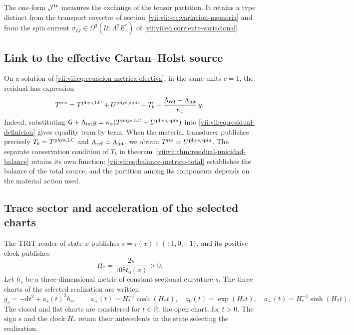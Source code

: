 The one-form \(\mathcal J^{\rm tr}\) measures the exchange of the tensor
partition. It retains a type distinct from the transport covector of
section~\ref{vii:vii:sec:variacion-memoria} and from the spin current
\(\sigma_{IJ}\in\Omega^3(\mathcal U;\Lambda^2E^*)\) of
\eqref{vii:vii:eq:corriente-variacional}.

\subsection{Link to the effective Cartan--Holst source}
\label{vii:vii:subsec:residual-fuente-cartan}

On a solution of \eqref{vii:vii:eq:ecuacion-metrica-efectiva}, in the
same units \(c=1\), the residual has expression
\begin{equation}
 T^{\rm res}
 =T^{\rm phys,LC}+U^{\rm phys,spin}-T_b
   +\frac{\Lambda_{\rm ref}-\Lambda_{\rm int}}{\kappa_x}\,g.
 \label{vii:vii:eq:residual-composicion-cartan}
\end{equation}
Indeed, substituting
\(\mathsf G+\Lambda_{\rm int}g
  =\kappa_x(T^{\rm phys,LC}+U^{\rm phys,spin})\)
into \eqref{vii:vii:eq:residual-definicion} gives equality term by term.
When the material transducer publishes precisely
\(T_b=T^{\rm phys,LC}\) and \(\Lambda_{\rm ref}=\Lambda_{\rm int}\),
we obtain \(T^{\rm res}=U^{\rm phys,spin}\).
The separate conservation condition of \(T_b\) in
theorem~\ref{vii:vii:thm:residual-unicidad-balance} retains its own
function: \eqref{vii:vii:eq:balance-metrico-total} establishes the balance of the
total source, and the partition among its components depends on the material
action used.

\subsection{Trace sector and acceleration of the selected charts}
\label{vii:vii:subsec:residual-aceleracion-ds}

The TRIT reader of state \(x\) publishes \(s=\tau(x)\in\{+1,0,-1\}\),
and its positive clock publishes
\begin{equation}
 H_*=\frac{2\pi}{108t_0(x)}>0.
 \label{vii:vii:eq:reloj-carta-ds}
\end{equation}
Let \(h_s\) be a three-dimensional metric of constant sectional curvature
\(s\). The three charts of the selected realization are written
\begin{equation}
 g_s=-\mathrm dt^2+a_s(t)^2h_s,\qquad
 a_+(t)=H_*^{-1}\cosh(H_*t),\quad
 a_0(t)=\exp(H_*t),\quad
 a_-(t)=H_*^{-1}\sinh(H_*t).
 \label{vii:vii:eq:cartas-ds-residual}
\end{equation}
The closed and flat charts are considered for \(t\in\mathbb R\);
the open chart, for \(t>0\). The sign \(s\) and the clock \(H_*\)
retain their antecedents in the state selecting the realization.

